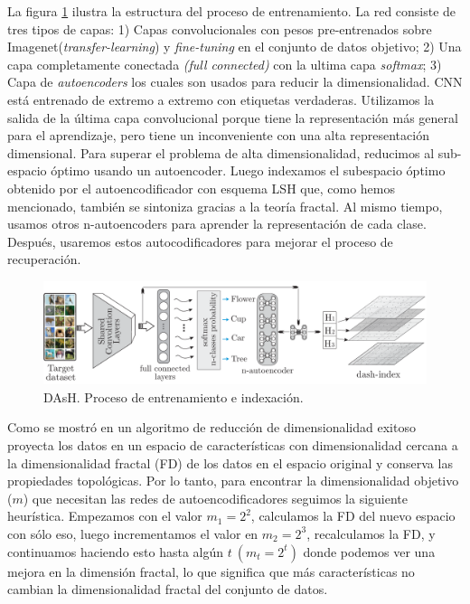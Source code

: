 La figura \ref{fig:dash} ilustra la estructura del proceso de entrenamiento. La red consiste de tres tipos de capas: 1) Capas convolucionales con pesos pre-entrenados sobre Imagenet(\textit{transfer-learning}) y \textit{fine-tuning} en el conjunto de datos objetivo; 2) Una capa completamente conectada \textit{(full connected)} con la ultima capa \textit{softmax}; 3) Capa de \textit{autoencoders} los cuales son usados para reducir la dimensionalidad. \acf{CNN} está entrenado de extremo a extremo con etiquetas verdaderas. Utilizamos la salida de la última capa convolucional porque tiene la representación más general para el aprendizaje, pero tiene un inconveniente con una alta representación dimensional. Para superar el problema de alta dimensionalidad, reducimos al sub-espacio óptimo usando un autoencoder. Luego indexamos el subespacio óptimo obtenido por el autoencodificador con esquema LSH que, como hemos mencionado, también se sintoniza gracias a la teoría fractal. Al mismo tiempo, usamos otros n-autoencoders para aprender la representación de cada clase. Después, usaremos estos autocodificadores para mejorar el proceso de recuperación.  
\begin{figure}[htp]\centering
\includegraphics[width=1.0\columnwidth]{chapter6/DAsh_learning_final.pdf}
\caption{ DAsH. Proceso de entrenamiento e indexación. } 
\label{fig:dash}
\end{figure} 		

Como se mostró en \cite{citeulike:fractal:encoders} un algoritmo de reducción de dimensionalidad exitoso proyecta los datos en un espacio de características con dimensionalidad cercana a la dimensionalidad fractal (FD) de los datos en el espacio original y conserva las propiedades topológicas.  Por lo tanto, para encontrar la dimensionalidad objetivo ($m$) que necesitan las redes de autoencodificadores seguimos la siguiente heurística.  Empezamos con el valor $m_1 = 2^2$, calculamos la FD del nuevo espacio con sólo eso, luego incrementamos el valor en $m_2 = 2^3$, recalculamos la FD, y continuamos haciendo esto hasta algún $ t\ (m_t =  2^t)$ donde podemos ver una mejora en la dimensión fractal, lo que significa que más características no cambian la dimensionalidad fractal del conjunto de datos.
 
